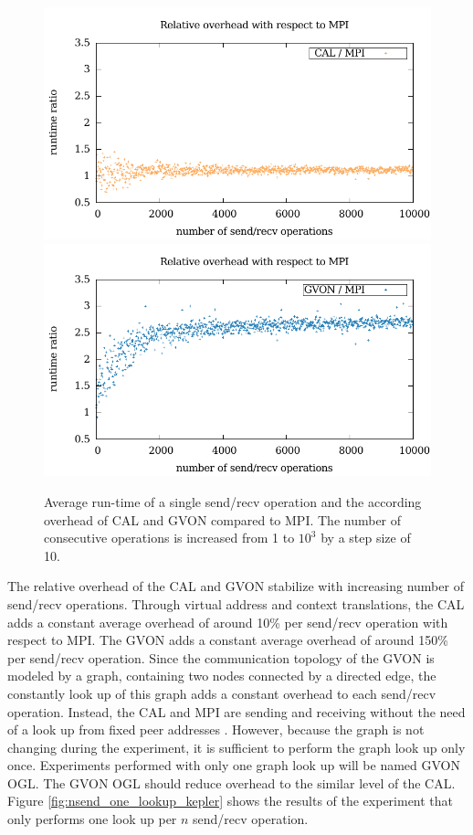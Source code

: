 \begin{figure}[H]
\begin{minipage}[t]{0.5\textwidth}
    \end{minipage}%
  \begin{minipage}[t]{0.5\textwidth}
    \includegraphics[width=\textwidth]{plots/50_nsend_overhead_cal}
    \includegraphics[width=\textwidth]{plots/50_nsend_overhead_gvon}
  \end{minipage}%
  \caption{Average run-time of a single send/recv operation and the
    according overhead of CAL and GVON compared to MPI. The number of
    consecutive operations is increased from 1 to $10^3$ by a step
    size of 10. }
  \label{fig:nsend_kepler}
\end{figure}

\noindent The relative overhead of the CAL and GVON stabilize with
increasing number of send/recv operations.  Through virtual address
and context translations, the CAL adds a constant average overhead of
around 10\% per send/recv operation with respect to MPI. The GVON adds
a constant average overhead of around 150\% per send/recv operation.
Since the communication topology of the GVON is modeled by a graph,
containing two nodes connected by a directed edge, the constantly look
up of this graph adds a constant overhead to each send/recv operation.
Instead, the CAL and MPI are sending and receiving without the need of
a look up from fixed peer addresses .  However, because the graph is
not changing during the experiment, it is sufficient to perform the
graph look up only once. Experiments performed with only one graph
look up will be named GVON OGL. The GVON OGL should reduce overhead to
the similar level of the CAL. Figure \ref{fig:nsend_one_lookup_kepler}
shows the results of the experiment that only performs one look up per
$n$ send/recv operation.

